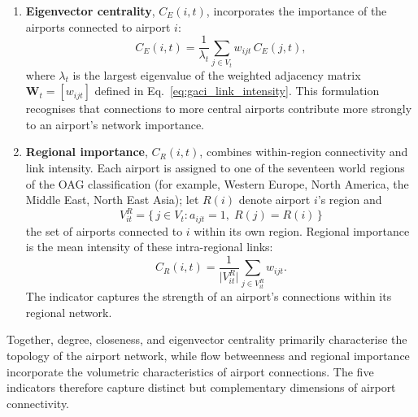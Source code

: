 \begin{enumerate}
    \item \textbf{Eigenvector centrality}, $C_E(i,t)$, incorporates the importance of the airports connected to airport $i$:
    \begin{equation}
        C_E(i,t)
        =
        \frac{1}{\lambda_t}
        \sum_{j\in V_t} w_{ijt}\, C_E(j,t),
        \label{eq:gaci_eigenvector}
    \end{equation}
    where $\lambda_t$ is the largest eigenvalue of the weighted adjacency matrix $\mathbf{W}_t=[w_{ijt}]$ defined in Eq.~\eqref{eq:gaci_link_intensity}. This formulation recognises that connections to more central airports contribute more strongly to an airport's network importance.

    \item \textbf{Regional importance}, $C_R(i,t)$, combines within-region connectivity and link intensity. Each airport is assigned to one of the seventeen world regions of the OAG classification (for example, Western Europe, North America, the Middle East, North East Asia); let $R(i)$ denote airport $i$'s region and
    \begin{equation}
        V^R_{it} = \bigl\{\, j \in V_t : a_{ijt}=1,\; R(j)=R(i) \,\bigr\}
        \label{eq:gaci_region_set}
    \end{equation}
    the set of airports connected to $i$ within its own region. Regional importance is the mean intensity of these intra-regional links:
    \begin{equation}
        C_R(i,t)
        =
        \frac{1}{\bigl|V^R_{it}\bigr|}
        \sum_{j \in V^R_{it}} w_{ijt}.
        \label{eq:gaci_regimp}
    \end{equation}
    The indicator captures the strength of an airport's connections within its regional network.
\end{enumerate}

Together, degree, closeness, and eigenvector centrality primarily characterise the topology of the airport network, while flow betweenness and regional importance incorporate the volumetric characteristics of airport connections. The five indicators therefore capture distinct but complementary dimensions of airport connectivity.

